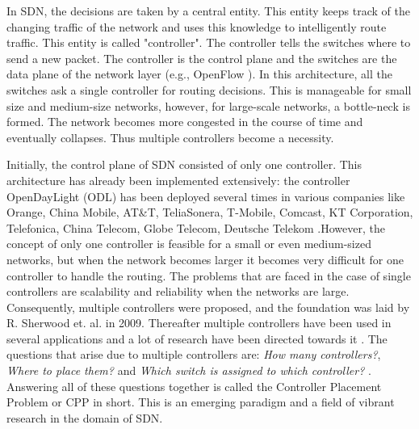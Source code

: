 \documentclass[times]{dacauth}
\begin{document}
In SDN, the decisions are taken by a central entity. This entity keeps track of the changing traffic of the network and uses this knowledge to intelligently route traffic. This entity is called "controller". The controller tells the switches where to send a new packet. The controller is the control plane and the switches are the data plane of the network layer (e.g., OpenFlow \cite{hu2014survey, sdniotsurvey2016}). In this architecture, all the switches ask a single controller for routing decisions. This is manageable for small size and medium-size networks, however, for large-scale networks, a bottle-neck is formed. The network becomes more congested in the course of time and eventually collapses. Thus multiple controllers become a necessity.

Initially, the control plane of SDN consisted of only one controller. This architecture has already been implemented extensively: the controller OpenDayLight (ODL) \cite{odl} has been deployed several times in various companies like Orange, China Mobile, AT\&T, TeliaSonera, T-Mobile, Comcast, KT Corporation, Telefonica, China Telecom, Globe Telecom, Deutsche Telekom \cite{sdnsurvey2017}.However, the concept of only one controller is feasible for a small or even medium-sized networks, but when the network becomes larger it becomes very difficult for one controller to handle the routing. The problems that are faced in the case of single controllers are scalability \cite{scalability2013dixit, scalability2013yeganeh} and reliability when the networks are large. Consequently, multiple controllers were proposed, and the foundation was laid by R. Sherwood et. al.\cite{flowvisor2009} in 2009.  Thereafter multiple controllers have been used in several applications \cite{whycpp2010, whycpp2013, whycpp2014} and a lot of research have been directed towards it \cite{cppsurvey2017, cppsurvey2018}.
The questions that arise due to multiple controllers are: \emph{How many controllers?}, \emph{Where to place them?} and \emph{Which switch is assigned to which controller?} \cite{sdnwan2014, sdnlarge2015}. Answering all of these questions together is called the Controller Placement Problem or CPP in short. This is an emerging paradigm and a field of vibrant research in the domain of SDN.
\end{document}
